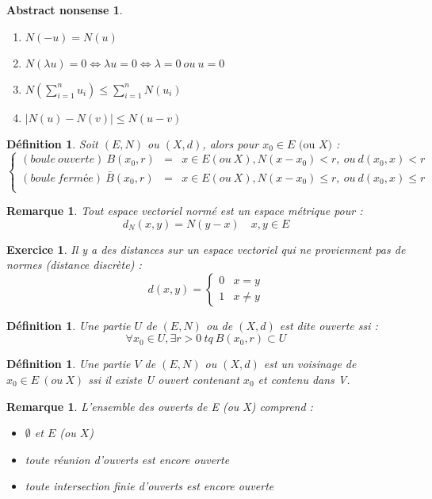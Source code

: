 \documentclass[a4paper, oneside]{report}
\theoremstyle{break}
\newtheorem{defi}[thm]{Définition}
\newtheorem{remar}[thm]{Remarque}
\newtheorem{exo}[thm]{Exercice}
\newtheorem*{absnon}{Abstract nonsense}
\newcommand{\ev}{espace vectoriel }
\newcommand{\evn}{espace vectoriel normé }
\begin{document}
\begin{absnon}
\begin{enumerate}
\item $N(-u)=N(u)$
\item $N(\lambda u)=0 \Leftrightarrow \lambda u =0 \Leftrightarrow \lambda =0~ou~u=0$
\item $N(\sum_{i=1}^{n}u_i) \leq \sum_{i=1}^{n}N(u_i)$
\item $|N(u)-N(v)|\leq N(u-v)$
\end{enumerate}
\end{absnon}


\begin{defi}
Soit $(E,N)$ ou $(X,d)$, alors pour $x_0\in E \text{ (ou }X)$ :
$$\left\{\begin{array}{lll}
(boule~ouverte)~B(x_0,r)&=& x\in E(ou~X), N(x-x_0)<r,~ou~d(x_0,x)<r\\
(boule~fermée)~\bar{B}(x_0,r)&=&x\in E(ou~X), N(x-x_0)\leq r,~ou~d(x_0,x)\leq r\\
\end{array}\right.$$
\end{defi}

\begin{remar}
Tout \evn est un espace métrique pour :
$$d_N(x,y)=N(y-x)\hspace{1em}x,y\in E$$
\end{remar}

\begin{exo}
Il y a des distances sur un \ev qui ne proviennent pas de normes (distance discrète) :
$$d(x,y)=\left\{\begin{array}{ll}
0 & x=y\\
1 & x\neq y
\end{array}\right.$$
\end{exo}

\begin{defi}
Une partie $U$ de $(E,N)$ ou de $(X, d)$ est dite ouverte ssi :
$$\forall x_0\in U, \exists r>0~tq~B(x_0,r)\subset U$$
\end{defi}

\begin{defi}        
Une partie $V$ de $(E,N)$ ou $(X, d)$ est un voisinage de $x_0\in E~(ou~X)$ ssi il existe U ouvert contenant $x_0$ et contenu dans V.
\end{defi}

\begin{remar}
L'ensemble des ouverts de E (ou X) comprend :
\begin{itemize}
\item $\emptyset$ et $E$ (ou $X$)
\item toute réunion d'ouverts est encore ouverte
\item toute intersection finie d'ouverts est encore ouverte
\end{itemize}
\end{remar}
\end{document}

